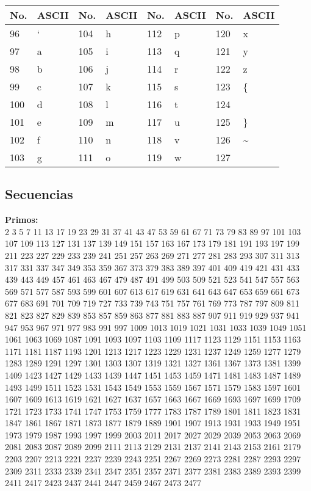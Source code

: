 \documentclass[10pt,landscape,twocolumn,letterpaper,twosided]{article}
\begin{document}
{{			\begin{tabular}{|l|l|l|l|l|l|l|l|}
				\hline \textbf{No.} & \textbf{ASCII} & \textbf{No.} & \textbf{ASCII}  &
					\textbf{No.} & \textbf{ASCII} & \textbf{No.} & \textbf{ASCII} \\ \hline
				96 & ` & 104 & h & 112 & p & 120 & x \\ \hline
				97 & a & 105 & i & 113 & q & 121 & y \\ \hline
				98 & b & 106 & j & 114 & r & 122 & z \\ \hline
				99 & c & 107 & k & 115 & s & 123 & \{ \\ \hline
				100 & d & 108 & l & 116 & t & 124 & \textbar \\ \hline
				101 & e & 109 & m & 117 & u & 125 & \} \\ \hline
				102 & f & 110 & n & 118 & v & 126 & \textasciitilde \\ \hline
				103 & g &  111 & o & 119 & w & 127 &  \\ \hline
			\end{tabular}
			
				\subsection{Secuencias}
						
					\textbf{Primos:}\\
					\vspace{3mm}
					2 3 5 7 11 13 17 19 23 29 31 37 41 43 47 53 59 61 67 71 73 79 83 89 97 101 103 107 109 113 127 131 137 139
					149 151 157 163 167 173 179 181 191 193 197 199 211 223 227 229 233 239 241 251 257 263 269 271 277 281 283
					293 307 311 313 317 331 337 347 349 353 359 367 373 379 383 389 397 401 409 419 421 431 433 439 443 449 457
					461 463 467 479 487 491 499 503 509 521 523 541 547 557 563 569 571 577 587 593 599 601 607 613 617 619 631
					641 643 647 653 659 661 673 677 683 691 701 709 719 727 733 739 743 751 757 761 769 773 787 797 809 811 821
					823 827 829 839 853 857 859 863 877 881 883 887 907 911 919 929 937 941 947 953 967 971 977 983 991 997
					1009 1013 1019 1021 1031 1033 1039 1049 1051 1061 1063 1069 1087 1091 1093 1097 1103 1109 1117 1123 1129
					1151 1153 1163 1171 1181 1187 1193 1201 1213 1217 1223 1229 1231 1237 1249 1259 1277 1279 1283 1289 1291
					1297 1301 1303 1307 1319 1321 1327 1361 1367 1373 1381 1399 1409 1423 1427 1429 1433 1439 1447 1451 1453
					1459 1471 1481 1483 1487 1489 1493 1499 1511 1523 1531 1543 1549 1553 1559 1567 1571 1579 1583 1597 1601
					1607 1609 1613 1619 1621 1627 1637 1657 1663 1667 1669 1693 1697 1699 1709 1721 1723 1733 1741 1747 1753 
					1759 1777 1783 1787 1789 1801 1811 1823 1831 1847 1861 1867 1871 1873 1877 1879 1889 1901 1907 1913 1931 
					1933 1949 1951 1973 1979 1987 1993 1997 1999 2003 2011 2017 2027 2029 2039 2053 2063 2069 2081 2083 2087 
					2089 2099 2111 2113 2129 2131 2137 2141 2143 2153 2161 2179 2203 2207 2213 2221 2237 2239 2243 2251 2267 
					2269 2273 2281 2287 2293 2297 2309 2311 2333 2339 2341 2347 2351 2357 2371 2377 2381 2383 2389 2393 2399 
					2411 2417 2423 2437 2441 2447 2459 2467 2473 2477

}}
\end{document}
